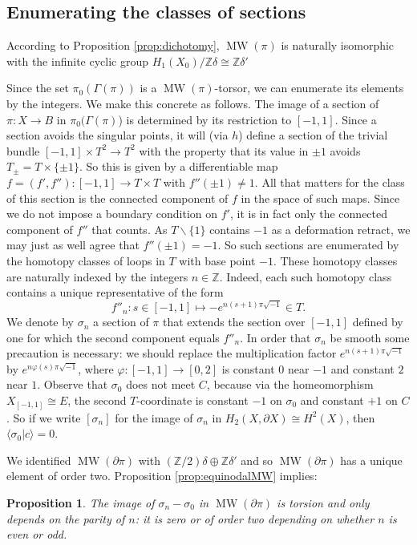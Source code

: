 \documentclass[10pt,letterpaper]{amsart}
\numberwithin{equation}{section}
\def\ZZ{{\mathbb Z}}
\def\ssm{\smallsetminus}
\def\G{\Gamma}
\newcommand{\p}{\partial}
\def\la{\langle}
\def\ra{\rangle}
\newcommand\MW{\operatorname{MW}}
\newtheorem{proposition}[theorem]{Proposition}
\theoremstyle{remark}
\begin{document}
\subsection{Enumerating the classes of sections}
According to Proposition \ref{prop:dichotomy}, $\MW(\pi)$ is naturally isomorphic with the infinite cyclic group
$H_1(X_0)/\ZZ\delta\cong \ZZ\delta'$

 Since the set $\pi_0(\G(\pi))$ is a $\MW(\pi)$-torsor, we can enumerate its elements by the integers. We make this concrete as follows.
The image of a section  of  $\pi: X\to B$ in  $\pi_0(\G(\pi)$) is determined by its restriction to $[-1,1]$. Since a section  avoids the singular points, it will  (via $h$) define a section 
of the trivial bundle $[-1,1]\times T^2\to T^2$  with the property that its value in $\pm 1$ avoids $T_\pm=T\times \{\pm 1\}$. So this is given by a differentiable map $f=(f',f''): [-1,1]\to T\times T$ with $f''(\pm 1)\not=1$. 
All that matters for the class of this section is the connected component  of $f$ in the space of such maps.  Since we do not impose a boundary condition on $f'$, it is in fact only the connected component of $f''$ that counts. As $T\ssm \{1\}$ contains ${-1}$ as a deformation retract, we may just as well agree that $f''(\pm 1)=-1$. So such  sections are enumerated by the homotopy classes of loops in $T$ with base point $-1$. These homotopy classes are naturally indexed by the integers  $n \in \ZZ$. Indeed,  each such homotopy class contains a unique representative of the form  
\[
f''_n: s\in [-1,1]\mapsto -e^{n(s+1)\pi\sqrt{-1}}\in T.
\]
We denote by $\sigma_n$ a section of $\pi$ that extends the section over  $[-1,1]$ defined by one for which the second component equals $f''_n$. In order that $\sigma_n$ be smooth some precaution is necessary: we should 
replace the multiplication factor $e^{n(s+1)\pi\sqrt{-1}}$ by $e^{n\varphi (s)\pi\sqrt{-1}}$, where $\varphi :[-1,1]\to [0,2]$ is constant $0$ near $-1$ and constant $2$ near $1$.  Observe that $\sigma_0$ does not meet $C$,  because 
via the homeomorphism  $X_{[-1,1]}\cong E$,  the second $T$-coordinate  is constant $-1$ on $\sigma_0$ and constant $+1$ on $C$. So if we write $[\sigma_n]$ for the image of 
$\sigma_n$ in $H_2(X, \p X)\cong H^2(X)$, then $\la \sigma_0 | c\ra =0$. 

We identified $\MW(\p\pi)$ with  $(\ZZ/2)\delta\oplus  \ZZ\delta'$ and so $\MW(\p\pi)$ has a unique element of order two. 
Proposition \ref{prop:equinodalMW} implies:

\begin{proposition}\label{prop:sectionrestriction}
The image of  $\sigma_n-\sigma_0$ in $\MW(\p\pi)$ is torsion and only depends on the parity of $n$: it is zero or of order two depending on whether $n$ is even or odd.
\end{proposition}
\end{document}
